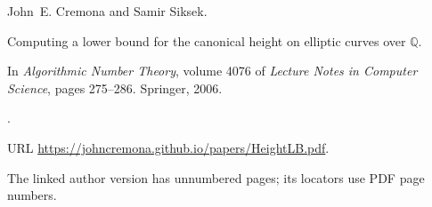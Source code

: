 John~E. Cremona and Samir Siksek.

\newblock Computing a lower bound for the canonical height on elliptic curves
  over {$\mathbb Q$}.

\newblock In \emph{Algorithmic Number Theory}, volume 4076 of \emph{Lecture
  Notes in Computer Science}, pages 275--286. Springer, 2006.

\newblock {}.

\newblock URL \url{https://johncremona.github.io/papers/HeightLB.pdf}.

\newblock The linked author version has unnumbered pages; its locators use PDF page numbers.
